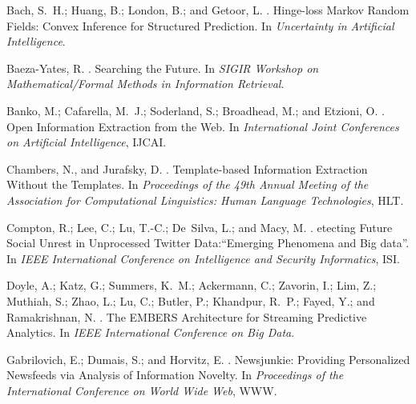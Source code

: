 \documentclass[letterpaper]{article}
\begin{document}
%
%
\begin{thebibliography}{}

Bach, S.~H.; Huang, B.; London, B.; and Getoor, L.
.
\newblock Hinge-loss {M}arkov {R}andom {F}ields: {C}onvex {I}nference for
  {S}tructured {P}rediction.
\newblock In {\em Uncertainty in Artificial Intelligence}.

Baeza-Yates, R.
.
\newblock Searching the {F}uture.
\newblock In {\em SIGIR Workshop on Mathematical/Formal Methods in Information
  Retrieval}.

Banko, M.; Cafarella, M.~J.; Soderland, S.; Broadhead, M.; and Etzioni, O.
.
\newblock Open {I}nformation {E}xtraction from the {W}eb.
\newblock In {\em International Joint Conferences on Artificial Intelligence},
  IJCAI.

Chambers, N., and Jurafsky, D.
.
\newblock Template-based {I}nformation {E}xtraction {W}ithout the {T}emplates.
\newblock In {\em Proceedings of the 49th Annual Meeting of the Association for
  Computational Linguistics: Human Language Technologies}, HLT.

Compton, R.; Lee, C.; Lu, T.-C.; De~Silva, L.; and Macy, M.
.
etecting {F}uture {S}ocial {U}nrest in {U}nprocessed {T}witter
  {D}ata:“{E}merging {P}henomena and {B}ig data”.
\newblock In {\em IEEE International Conference on Intelligence and Security
  Informatics}, ISI.

Doyle, A.; Katz, G.; Summers, K.~M.; Ackermann, C.; Zavorin, I.; Lim, Z.;
  Muthiah, S.; Zhao, L.; Lu, C.; Butler, P.; Khandpur, R.~P.; Fayed, Y.; and
  Ramakrishnan, N.
.
\newblock The {EMBERS} {A}rchitecture for {S}treaming {P}redictive {A}nalytics.
\newblock In {\em {IEEE} International Conference on Big Data}.

Gabrilovich, E.; Dumais, S.; and Horvitz, E.
.
\newblock Newsjunkie: {P}roviding {P}ersonalized {N}ewsfeeds via {A}nalysis of
  {I}nformation {N}ovelty.
\newblock In {\em Proceedings of the International Conference on World Wide
  Web}, WWW.


\end{thebibliography}
\end{document}
